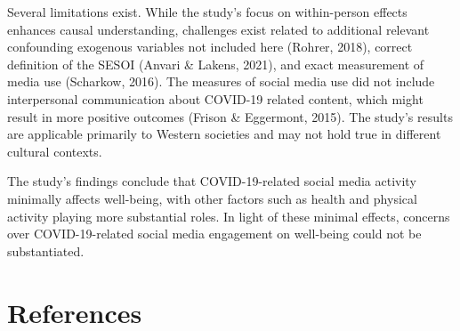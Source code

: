 \documentclass[
  man,mask,floatsintext]{apa7}
\begin{document}
Several limitations exist. While the study's focus on within-person effects enhances causal understanding, challenges exist related to additional relevant confounding exogenous variables not included here (Rohrer, 2018), correct definition of the SESOI (Anvari \& Lakens, 2021), and exact measurement of media use (Scharkow, 2016).
The measures of social media use did not include interpersonal communication about COVID-19 related content, which might result in more positive outcomes (Frison \& Eggermont, 2015).
The study's results are applicable primarily to Western societies and may not hold true in different cultural contexts.

The study's findings conclude that COVID-19-related social media activity minimally affects well-being, with other factors such as health and physical activity playing more substantial roles.
In light of these minimal effects, concerns over COVID-19-related social media engagement on well-being could not be substantiated.

\newpage

\section{References}\label{references}
\end{document}
